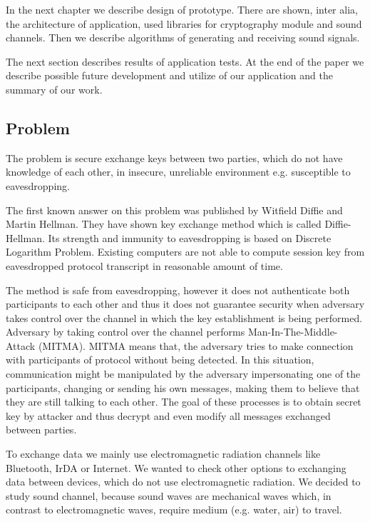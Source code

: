 \documentclass[11pt,titlepage]{article}
\theoremstyle{plain}
\begin{document}
\vspace{5mm}

In the next chapter we describe design of prototype. There are shown, inter alia, the architecture of application, used libraries for cryptography module and sound channels. Then we describe algorithms of generating and receiving sound signals. 

The next section describes results of application tests. At the end of the paper we describe possible future development and utilize of our application and the summary of our work.

\subsection{Problem}

The problem is secure exchange keys between two parties, which do not have knowledge of each other, in insecure, unreliable environment e.g. susceptible to eavesdropping.

\vspace{5mm}

The first known answer on this problem was published by Witfield Diffie and Martin Hellman. They have shown key exchange method which is called Diffie-Hellman. Its strength and immunity to eavesdropping is based on Discrete Logarithm Problem. Existing computers are not able to compute session key from eavesdropped protocol transcript in reasonable amount of time.

\vspace{5mm}

The method is safe from eavesdropping, however it does not authenticate both participants to each other and thus it does not guarantee security when adversary takes control over the channel in which the key establishment is being performed. Adversary by taking control over the channel performs Man-In-The-Middle-Attack (MITMA). MITMA means that, the adversary tries to make connection with participants of protocol without being detected. In this situation, communication might be manipulated by the adversary impersonating one of the participants, changing or sending his own messages, making them to believe that they are still talking to each other. The goal of these processes is to obtain secret key by attacker and thus decrypt and even modify all messages exchanged between parties.

\vspace{5mm}

To exchange data we mainly use electromagnetic radiation channels like Bluetooth, IrDA or Internet. We wanted to check other options to exchanging data between devices, which do not use electromagnetic radiation. We decided to study sound channel, because sound waves are mechanical waves which, in contrast to electromagnetic waves, require medium (e.g. water, air) to travel. 
\end{document}
